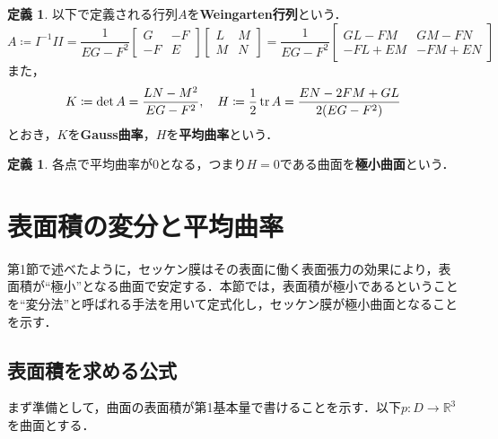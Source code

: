 \documentclass[a4j]{ltjsarticle}
\newcommand{\Rset}{\mathbb{R}}
\numberwithin{equation}{section}
\theoremstyle{definition}
\newtheorem{dfn}[thm]{定義}
\begin{document}
\begin{dfn}
    以下で定義される行列$A$を\textbf{Weingarten行列}という．
    \begin{equation}
        A\coloneq I^{-1}I\!I=\frac{1}{EG-F^2}\begin{bmatrix}
            G & -F\\
            -F & E
        \end{bmatrix}\begin{bmatrix}
            L & M\\
            M & N
        \end{bmatrix}=\frac{1}{EG-F^2}\begin{bmatrix}
            GL-FM & GM-FN\\
            -FL+EM & -FM+EN
        \end{bmatrix}
    \end{equation}
    また，
    \begin{equation}
        K\coloneq \det A=\frac{LN-M^2}{EG-F^2},\quad H\coloneq \frac{1}{2}\tr A=\frac{EN-2FM+GL}{2(EG-F^2)}
    \end{equation}
    とおき，$K$を\textbf{Gauss曲率}，$H$を\textbf{平均曲率}という．
\end{dfn}
\begin{dfn}
    各点で平均曲率が0となる，つまり$H=0$である曲面を\textbf{極小曲面}という．
\end{dfn}
\section{表面積の変分と平均曲率}
第1節で述べたように，セッケン膜はその表面に働く表面張力の効果により，表面積が``極小''となる曲面で安定する．本節では，表面積が極小であるということを``変分法''と呼ばれる手法を用いて定式化し，セッケン膜が極小曲面となることを示す．
\subsection{表面積を求める公式}
まず準備として，曲面の表面積が第1基本量で書けることを示す．以下$p:D\to \Rset^3$を曲面とする．
\end{document}
